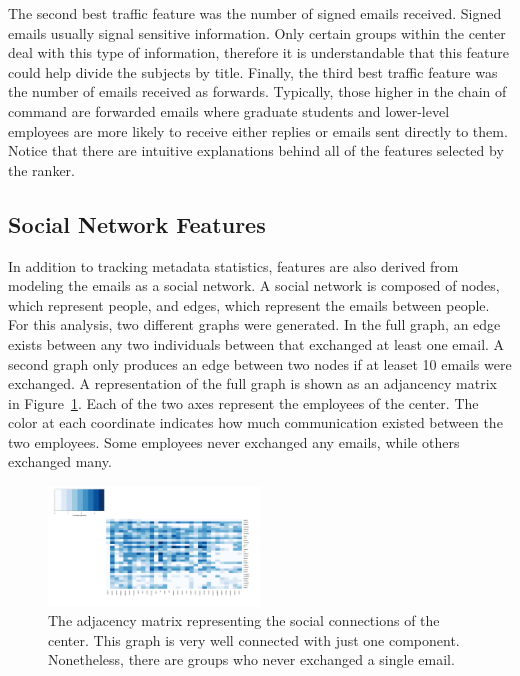 \documentclass{article}
\begin{document}
The second best traffic feature was the number of signed emails received.  Signed emails usually signal sensitive information.  Only certain groups within the center deal with this type of information, therefore it is understandable that this feature could help divide the subjects by title.  Finally, the third best traffic feature was the number of emails received as forwards.  Typically, those higher in the chain of command are forwarded emails where graduate students and lower-level employees are more likely to receive either replies or emails sent directly to them.  Notice that there are intuitive explanations behind all of the features selected by the ranker.


\subsection{Social Network Features}
In addition to tracking metadata statistics, features are also derived from modeling the emails as a social network.  A social network is composed of nodes, which represent people, and edges, which represent the emails between people.  For this analysis, two different graphs were generated.  In the full graph, an edge exists between any two individuals between that exchanged at least one email.  A second graph only produces an edge between two nodes if at leaset 10 emails were exchanged.  A representation of the full graph is shown as an adjancency matrix in Figure~\ref{fig:adj_matrix}.  Each of the two axes represent the employees of the center.  The color at each coordinate indicates how much communication existed between the two employees.  Some employees never exchanged any emails, while others exchanged many.

\begin{figure}[H]
    \centering
        \includegraphics[width=0.5\textwidth]{adj_matrix}
        \caption{The adjacency matrix representing the social connections of the center.  This graph is very well connected with just one component.  Nonetheless, there are groups who never exchanged a single email.}
        \label{fig:adj_matrix}
\end{figure}
\end{document}
